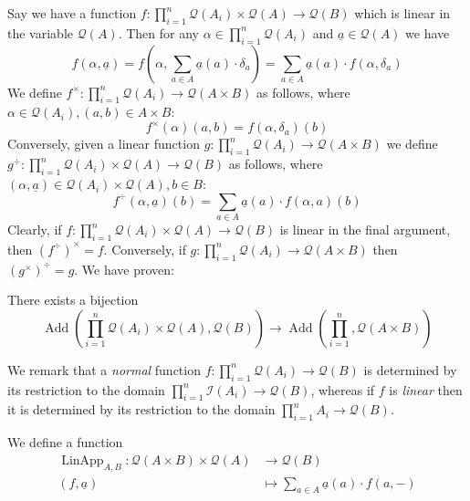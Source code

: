 \documentclass[runningheads]{llncs}
\newcommand{\call}[1]{\mathcal{#1}}
\newcommand{\Ical}{\call{I}}
\newcommand{\Qcal}{\call{Q}}
\newcommand{\lto}{\longrightarrow}
\begin{document}
Say we have a function $f: \prod_{i = 1}^n \call{Q}(A_i) \times \call{Q}(A) \lto \call{Q}(B)$ which is linear in the variable $\call{Q}(A)$. Then for any $\alpha \in \prod_{i = 1}^n\call{Q}(A_i)$ and $\underline{a} \in \call{Q}(A)$ we have
\begin{equation}
	f(\alpha, \underline{a}) = f(\alpha, \sum_{a \in A}\underline{a}(a)\cdot \delta_a) = \sum_{a \in A}\underline{a}(a) \cdot f(\alpha, \delta_a)
\end{equation}
We define $f^\times: \prod_{i = 1}^n \Qcal(A_i) \lto \Qcal(A \times B)$ as follows, where $\alpha \in \Qcal(A_i), (a,b) \in A \times B$:
\begin{equation}
	f^\times(\alpha)(a,b) = f(\alpha, \delta_{a})(b)
\end{equation}
Conversely, given a linear function $g: \prod_{i = 1}^{n}\call{Q}(A_i) \lto \call{Q}(A \times B)$ we define $g^\div: \prod_{i = 1}^n\call{Q}(A_i) \times \call{Q}(A) \lto \call{Q}(B)$ as follows, where $(\alpha, \underline{a}) \in \Qcal(A_i) \times \Qcal(A), b \in B$:
\begin{equation}
f^\div(\alpha, \underline{a})(b) =  \sum_{a \in A}\underline{a}(a) \cdot f(\alpha, a)(b)
\end{equation}
Clearly, if $f: \prod_{i = 1}^n\call{Q}(A_i) \times \call{Q}(A) \lto \call{Q}(B)$ is linear in the final argument, then $(f^\div)^\times = f$. Conversely, if $g: \prod_{i = 1}^n \call{Q}(A_i) \lto \call{Q}(A \times B)$ then $(g^\times)^\div = g$. We have proven:
\begin{proposition}
    There exists a bijection
    \begin{equation}
        \operatorname{Add}(\prod_{i = 1}^n \call{Q}(A_i) \times \call{Q}(A), \call{Q}(B)) \lto \operatorname{Add}(\prod_{i = 1}^n, \call{Q}(A \times B))
    \end{equation}
\end{proposition}
	
	\begin{remark}
		We remark that a \emph{normal} function $f: \prod_{i=1}^n \Qcal(A_i) \lto \Qcal(B)$ is determined by its restriction to the domain $\prod_{i=1}^n\Ical(A_i) \lto \Qcal(B)$, whereas if $f$ is \emph{linear} then it is determined by its restriction to the domain $\prod_{i=1}^n A_i \lto \Qcal(B)$.
		\end{remark}
\begin{definition}
We define a function
\begin{align*}
	\operatorname{LinApp}_{A,B}: \call{Q}(A \times B) \times \call{Q}(A) &\lto \call{Q}(B)\\
	(f, \underline{a}) &\longmapsto \sum_{a \in A}\underline{a}(a)\cdot f(a, -)
\end{align*}
\end{definition}
\end{document}
